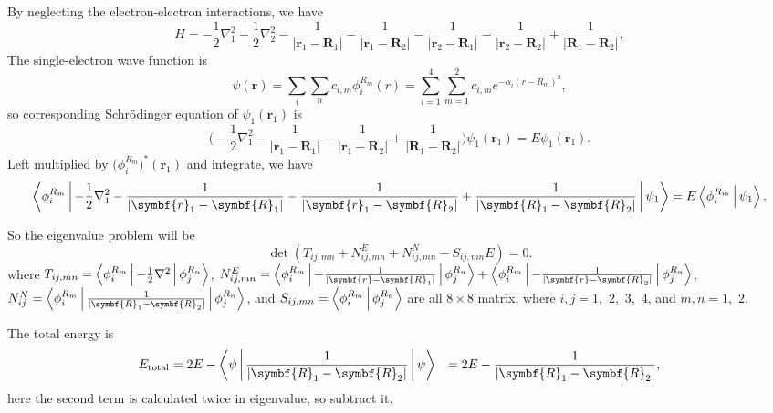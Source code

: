 \documentclass[12pt]{article}
\begin{document}
By neglecting the electron-electron interactions, we have
\begin{equation}
    H = - \frac{1}{2}\nabla_1^2
    - \frac{1}{2}\nabla_2^2
    - \frac{1}{\lvert \symbf{r}_1 - \symbf{R}_1 \rvert} - \frac{1}{\lvert \symbf{r}_1 - \symbf{R}_2 \rvert}
    - \frac{1}{\lvert \symbf{r}_2 - \symbf{R}_1 \rvert} - \frac{1}{\lvert \symbf{r}_2 - \symbf{R}_2 \rvert}
    + \frac{1}{\lvert \symbf{R}_1 - \symbf{R}_2 \rvert},
\end{equation}
The single-electron wave function is
\begin{equation}
    \psi(\symbf{r}) = \sum_{i} \sum_n c_{i, m}\phi_{i}^{R_m}(r) =
    \sum_{i=1}^{4}\sum_{m=1}^{2} c_{i, m} e^{-\alpha_i (r - R_m)^2},
\end{equation}
so corresponding Schr\"{o}dinger equation of $\psi_1(\symbf{r}_1)$ is
\begin{equation}
    \Big(- \frac{1}{2}\nabla_1^2
    - \frac{1}{\lvert \symbf{r}_1 - \symbf{R}_1 \rvert}
    - \frac{1}{\lvert \symbf{r}_1 - \symbf{R}_2 \rvert}
    + \frac{1}{\lvert \symbf{R}_1 -
        \symbf{R}_2 \rvert} \Big) \psi_1(\symbf{r}_1)
    = E \psi_1 (\symbf{r}_1).
\end{equation}
Left multiplied by $\Big( \phi_i^{R_m} \Big)^\ast(\symbf{r}_1)$ and integrate, we have
\begin{equation}
    \Braket{\phi_i^{R_m} |
        - \frac{1}{2}\nabla_1^2
        - \frac{1}{\lvert \symbf{r}_1 - \symbf{R}_1 \rvert}
        - \frac{1}{\lvert \symbf{r}_1 - \symbf{R}_2 \rvert}
        + \frac{1}{\lvert \symbf{R}_1 -
            \symbf{R}_2 \rvert} |  \psi_1}
    = E \Braket{\phi_i^{R_m} | \psi_1}.
\end{equation}

So the eigenvalue problem will be
\begin{equation}
    \det(T_{ij, mn} + N^E_{ij, mn} + N^N_{ij, mn} - S_{ij, mn} E ) = 0.
\end{equation}
where $T_{ij, mn} = \Braket{\phi_i^{R_m} | - \frac{1}{2}\nabla^2 | \phi_j^{R_n} }$,
$N^E_{ij, mn}=\Braket{\phi_i^{R_m} |
        -\frac{1}{\lvert \symbf{r} - \symbf{R}_1 \rvert } | \phi_j^{R_n} }
    + \Braket{\phi_i^{R_m} |
        -\frac{1}{\lvert \symbf{r} - \symbf{R}_2 \rvert } | \phi_j^{R_n} }$,
$N^N_{ij} = \Braket{\phi_i^{R_m} |
        \frac{1}{\lvert \symbf{R}_1 - \symbf{R}_2 \rvert } | \phi_j^{R_n} }$,
and
$S_{ij, mn} = \Braket{\phi_i^{R_m} | \phi_j^{R_n} }$
are all $8\times 8$ matrix,
where $i, j=1$,~$2$,~$3$,~$4$, and $m, n=1$,~$2$.

The total energy is
\begin{equation}
    \begin{aligned}
        E_{\text{total}} & = 2 E - \Braket{\psi | \frac{1}{\lvert \symbf{R}_1 - \symbf{R}_2 \rvert } | \psi}
                         & = 2 E - \frac{1}{\lvert \symbf{R}_1 - \symbf{R}_2 \rvert},
    \end{aligned}
\end{equation}
here the second term is calculated twice in eigenvalue, so subtract it.
\end{document}
